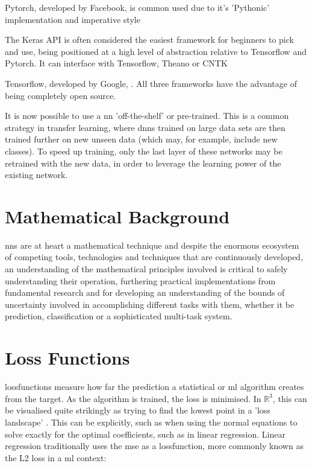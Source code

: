 Pytorch, developed by Facebook, is common used due to it's 'Pythonic' implementation and imperative style 


The Keras API is often considered the easiest framework for beginners to pick and use, being positioned at a high level of abstraction relative to Tensorflow and Pytorch. It can interface with Tensorflow, Theano or CNTK  \bigskip

Tensorflow, developed by Google,  \cite{tale_dl}. All three frameworks have the advantage of being completely open source. \bigskip

It is now possible to use a  \gls{nn} 'off-the-shelf' or pre-trained. This is a common strategy in transfer learning, where \gls{dnn}s trained on large data sets are then trained further on new unseen data (which may, for example, include new classes). To speed up training, only the last layer of these networks may be retrained with the new data, in order to leverage the learning power of the existing network. \bigskip

\section*{Mathematical Background}


\gls{nn}s are at heart a mathematical technique and despite the enormous ecosystem of competing tools, technologies and techniques that are continuously developed, an understanding of the mathematical principles involved  is critical to safely understanding their operation, furthering practical implementations from fundamental research and for developing an understanding of the bounds of uncertainty involved in accomplishing different tasks with them, whether it be prediction, classification or a sophisticated multi-task system.

\section{Loss Functions}

\gls{lossfunction}s measure how far the prediction a statistical or \gls{ml} algorithm creates from the target. As the algorithm is trained, the loss is minimised. In $\mathds{R}^3$, this can be visualised quite strikingly as trying to find the lowest point in a 'loss landscape' \cite{loss_landscape}. This can be explicitly, such as when using the normal equations to solve exactly for the optimal coefficients, such as in linear regression. Linear regression traditionally uses the  \gls{mse} as a \gls{lossfunction}, more commonly known as the L2 loss in a \gls{ml} context:


